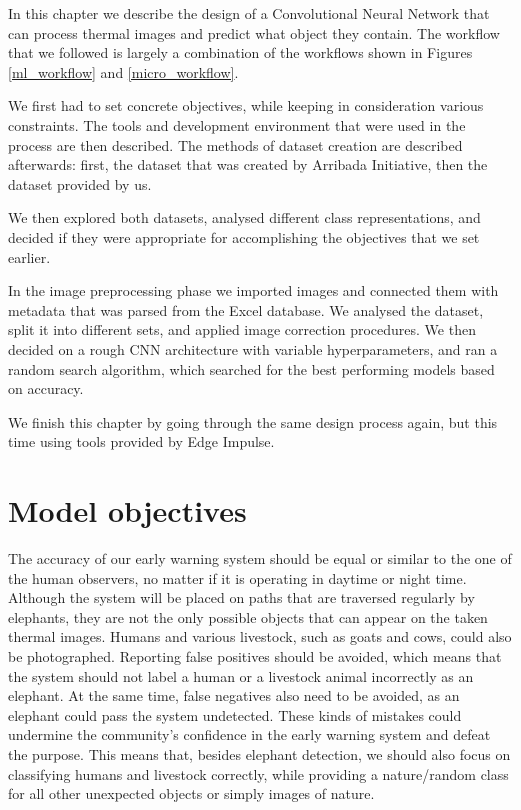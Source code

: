 In this chapter we describe the design of a Convolutional Neural Network that can process thermal images and predict what object they contain.
The workflow that we followed is largely a combination of the workflows shown in Figures \ref{ml_workflow} and \ref{micro_workflow}.

We first had to set concrete objectives, while keeping in consideration various constraints.
The tools and development environment that were used in the process are then described. 
The methods of dataset creation are described afterwards: first, the dataset that was created by Arribada Initiative, then the dataset provided by us. 

We then explored both datasets, analysed different class representations, and decided if they were appropriate for accomplishing the objectives that we set earlier.

In the image preprocessing phase we imported images and connected them with metadata that was parsed from the Excel database.
We analysed the dataset, split it into different sets, and applied image correction procedures.
We then decided on a rough CNN architecture with variable hyperparameters, and ran a random search algorithm, which searched for the best performing models based on accuracy.

We finish this chapter by going through the same design process again, but this time using tools provided by Edge Impulse.


\section{ Model objectives}\label{model_obj}


The accuracy of our early warning system should be equal or similar to the one of the human observers, no matter if it is operating in daytime or night time.
Although the system will be placed on paths that are traversed regularly by elephants, they are not the only possible objects that can appear on the taken thermal images.
Humans and various livestock, such as goats and cows, could also be photographed.
Reporting false positives should be avoided, which means that the system should not label a human or a livestock animal incorrectly as an elephant.
At the same time, false negatives also need to be avoided, as an elephant could pass the system undetected.
These kinds of mistakes could undermine the community's confidence in the early warning system and defeat the purpose.
This means that, besides elephant detection, we should also focus on classifying humans and livestock correctly, while providing a nature/random class for all other unexpected objects or simply images of nature.

